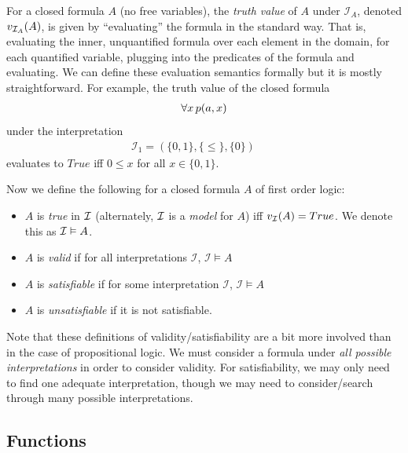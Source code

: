 \documentclass[10pt]{article}
\begin{document}
For a closed formula $A$ (no free variables), the \textit{truth value} of $A$ under $\mathcal{I}_A$, denoted $v_{\mathcal{I}_A}(A)$, is given by ``evaluating'' the formula in the standard way. That is, evaluating the inner, unquantified formula over each element in the domain, for each quantified variable, plugging into the predicates of the formula and evaluating. We can define these evaluation semantics formally but it is mostly straightforward. For example, the truth value of the closed formula
\begin{align*}
    \forall x \, p(a,x)
\end{align*}
under the interpretation 
\begin{align*}
    \mathcal{I}_1 = (\{0,1\},\{\leq\},\{0\})\qquad 
\end{align*} 
evaluates to $True$ iff $0 \leq x$ for all $x \in \{0,1\}$.

Now we define the following for a closed formula $A$ of first order logic:
\begin{itemize}
    \item $A$ is \textit{true} in $\mathcal{I}$ (alternately, $\mathcal{I}$ is a \textit{model} for $A$) iff $v_{\mathcal{I}}(A)=True$. We denote this as $\mathcal{I} \vDash A$.
    \item $A$ is \textit{valid} if for all interpretations $\mathcal{I}$, $\mathcal{I} \vDash A$
    \item $A$ is \textit{satisfiable} if for some interpretation $\mathcal{I}$, $\mathcal{I} \vDash A$
    \item $A$ is \textit{unsatisfiable} if it is not satisfiable.
\end{itemize}
Note that these definitions of validity/satisfiability are a bit more involved than in the case of propositional logic. We must consider a formula under \textit{all possible interpretations} in order to consider validity. For satisfiability, we may only need to find one adequate interpretation, though we may need to consider/search through many possible interpretations.

\subsection{Functions}
\label{sec:fol-with-functions}
\end{document}

